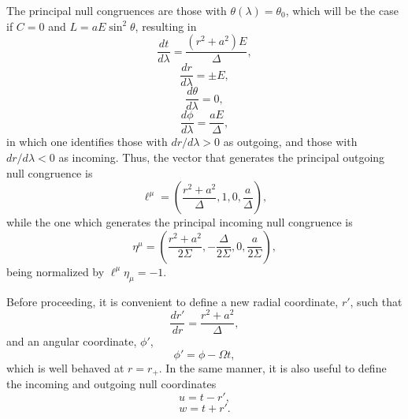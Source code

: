 \documentclass[
12pt,		%
openright,	%
twoside,  %
a4paper,			%
chapter=TITLE,		%
english,			%
french,				%
spanish,			%
brazil				%
]{USPSC-classe/USPSC}
\begin{document}
\begin{apendicesenv}
The principal null congruences are those with $\theta(\lambda)=\theta_0$, which will be the case if $C=0$ and $L=aE\sin^2{\theta}$, resulting in
\begin{equation}
    \frac{dt}{d\lambda}=\frac{(r^2+a^2)E}{\Delta},
\end{equation}
\begin{equation}\label{rkerr}
    \frac{dr}{d\lambda}=\pm E,
\end{equation}
\begin{equation}
    \frac{d\theta}{d\lambda}=0,
\end{equation}
\begin{equation}
    \frac{d\phi}{d\lambda}=\frac{aE}{\Delta},
\end{equation}
in which one identifies those with $dr/d\lambda>0$ as outgoing, and those with $dr/d\lambda<0$ as incoming. Thus, the vector that generates the principal outgoing null congruence is
\begin{equation}
    \ell^{\mu}=\left(\frac{r^2+a^2}{\Delta},1,0,\frac{a}{\Delta}\right),
     \end{equation}
     while the one which generates the principal incoming null congruence is
    \begin{equation}\eta^{\mu}=\left(\frac{r^2+a^2}{2\Sigma},-\frac{\Delta}{2\Sigma},0,\frac{a}{2\Sigma}\right),
\end{equation}
being normalized by $\ell^{\mu}\eta_{\mu}=-1$. 

Before proceeding, it is convenient to define a new radial coordinate, $r'$, such that
\begin{equation}\label{tortoiseKerr}
    \frac{dr'}{dr}=\frac{r^2+a^2}{\Delta},
\end{equation}
and an angular coordinate, $\phi'$, 
\begin{equation}\label{phiKerr}
    \phi'=\phi-\Omega t,
\end{equation}
which is well behaved at $r=r_+$. In the same manner, it is also useful to define the incoming and outgoing null coordinates
\begin{equation}\label{null1kerr}
    u=t-r',
\end{equation}
\begin{equation}\label{null2kerr}
    w=t+r'.
\end{equation}


\end{apendicesenv}
\end{document}
